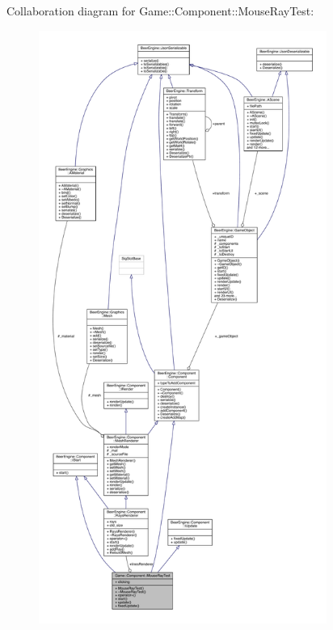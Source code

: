 Collaboration diagram for Game\+:\+:Component\+:\+:Mouse\+Ray\+Test\+:
\nopagebreak
\begin{figure}[H]
\begin{center}
\leavevmode
\includegraphics[height=550pt]{class_game_1_1_component_1_1_mouse_ray_test__coll__graph}
\end{center}
\end{figure}
